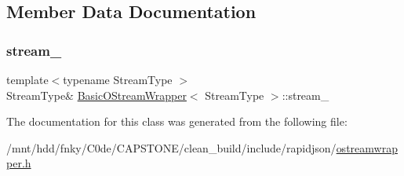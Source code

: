 \subsection{Member Data Documentation}
\mbox{\label{classBasicOStreamWrapper_a21f88a6682bed5b3168baca2a0802736}} 
\subsubsection{\texorpdfstring{stream\+\_\+}{stream\_}}
{\footnotesize\ttfamily template$<$typename Stream\+Type $>$ \\
Stream\+Type\& \hyperlink{classBasicOStreamWrapper}{Basic\+O\+Stream\+Wrapper}$<$ Stream\+Type $>$\+::stream\+\_\+\hspace{0.3cm}{\ttfamily [private]}}



The documentation for this class was generated from the following file\+:\begin{DoxyCompactItemize}
\item 
/mnt/hdd/fnky/\+C0de/\+C\+A\+P\+S\+T\+O\+N\+E/clean\+\_\+build/include/rapidjson/\hyperlink{ostreamwrapper_8h}{ostreamwrapper.\+h}\end{DoxyCompactItemize}
